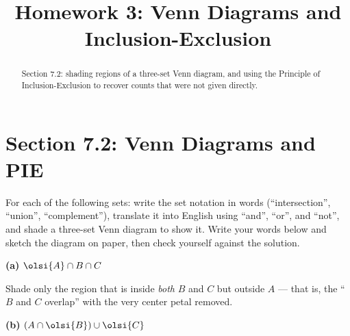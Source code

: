 \documentclass[12pt]{ximera}
\title{Homework 3: Venn Diagrams and Inclusion-Exclusion}
\begin{document}
\begin{abstract}
Section 7.2: shading regions of a three-set Venn diagram, and using the Principle of
Inclusion-Exclusion to recover counts that were not given directly.
\end{abstract}
\maketitle

\section*{Section 7.2: Venn Diagrams and PIE}

\begin{problem}
For each of the following sets: write the set notation in words (``intersection'',
``union'', ``complement''), translate it into English using ``and'', ``or'', and
``not'', and shade a three-set Venn diagram to show it. Write your words below and
sketch the diagram on paper, then check yourself against the solution.

\begin{prompt}
\textbf{(a)} $\olsi{A}\cap B\cap C$

\begin{freeResponse}
\end{freeResponse}

\begin{feedback}
Shade only the region that is inside \emph{both} $B$ and $C$ but outside $A$ ---
that is, the ``$B$ and $C$ overlap'' with the very center petal removed.
\begin{center}
\end{center}
\end{feedback}
\end{prompt}

\begin{prompt}
\textbf{(b)} $\left(A\cap\olsi{B}\right)\cup\olsi{C}$


\end{prompt}
\end{problem}
\end{document}
